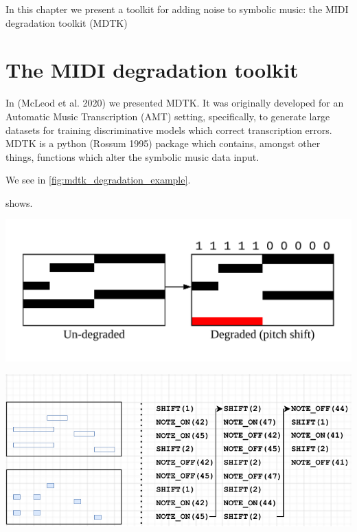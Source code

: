 \documentclass[12pt,a4paper,]{report}
\let\origfigure=\figure
\let\endorigfigure=\endfigure
\renewenvironment{figure}[1][]{%
\origfigure[b]
}{%
\endorigfigure
}
\begin{document}
In this chapter we present a toolkit for adding noise to symbolic music:
the MIDI degradation toolkit (MDTK)

\hypertarget{the-midi-degradation-toolkit}{%
\section{The MIDI degradation
toolkit}\label{the-midi-degradation-toolkit}}

In (McLeod et al. 2020) we presented MDTK. It was originally developed
for an Automatic Music Transcription (AMT) setting, specifically, to
generate large datasets for training discriminative models which correct
transcription errors. MDTK is a python (Rossum 1995) package which
contains, amongst other things, functions which alter the symbolic music
data input.

We see in \ref{fig:mdtk_degradation_example}.

 shows.

\begin{figure}[htbp]
\centering
\includegraphics[width=1.0\textwidth]{source/figures/example.png}
\caption[Example MDTK degradation]{An example degradation performed by MDTK}\label{fig:mdtk_degradation_example}
\end{figure}

\begin{figure}[htbp]
\centering
\includegraphics[width=1.0\textwidth]{source/figures/dataformats.pdf}
\caption[Different data formats handled]{Data formats.}\label{fig:data_formats}
\end{figure}
\end{document}
